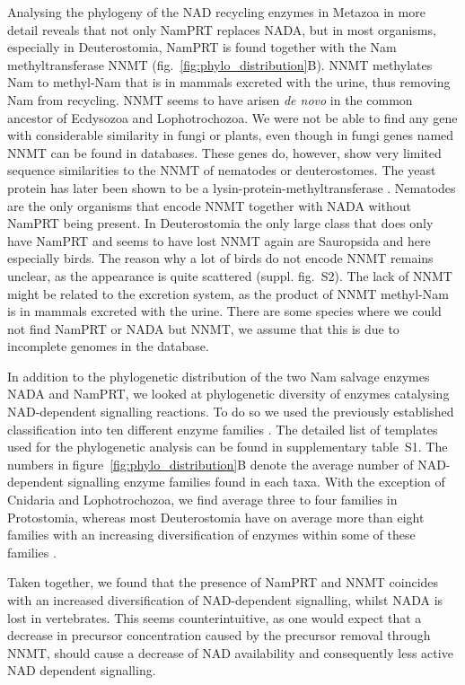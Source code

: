 Analysing the phylogeny of the NAD recycling enzymes in Metazoa in more detail reveals that not only NamPRT replaces NADA, but in most organisms, especially in Deuterostomia, NamPRT is found together with the Nam methyltransferase NNMT (fig.~\ref{fig:phylo_distribution}B). NNMT methylates Nam to methyl-Nam that is in mammals excreted with the urine, thus removing Nam from recycling. NNMT seems to have arisen \textit{de novo} in the common ancestor of Ecdysozoa and Lophotrochozoa. We were not be able to find any gene with considerable similarity in fungi or plants, even though in fungi genes named NNMT can be found in databases. These genes do, however, show very limited sequence similarities to the NNMT of nematodes or deuterostomes. The yeast protein has later been shown to be a lysin-protein-methyltransferase \cite{Wlodarski2011}. Nematodes are the only organisms that encode NNMT together with NADA without NamPRT being present. In Deuterostomia the only large class that does only have NamPRT and seems to have lost NNMT again are Sauropsida and here especially birds. The reason why a lot of birds do not encode NNMT remains unclear, as the appearance is quite scattered (suppl. fig.~S2). The lack of NNMT might be related to the excretion system, as the product of NNMT methyl-Nam is in mammals excreted with the urine. There are some species where we could not find NamPRT or NADA but NNMT, we assume that this is due to incomplete genomes in the database.

In addition to the phylogenetic distribution of the two Nam salvage enzymes NADA and NamPRT, we looked at phylogenetic diversity of enzymes catalysing NAD-dependent signalling reactions. To do so we used the previously established classification into ten different enzyme families \cite{Gossmann2012FEBS}. The detailed list of templates used for the phylogenetic analysis can be found in supplementary table~S1. The numbers in figure~\ref{fig:phylo_distribution}B denote the average number of NAD-dependent signalling enzyme families found in each taxa. With the exception of Cnidaria and Lophotrochozoa, we find average three to four families in Protostomia, whereas most Deuterostomia have on average more than eight families with an increasing diversification of enzymes within some of these families \cite{Gossmann2014DNAR}.

Taken together, we found that the presence of NamPRT and NNMT coincides with an increased diversification of NAD-dependent signalling, whilst NADA is lost in vertebrates. This seems counterintuitive, as one would expect that a decrease in precursor concentration caused by the precursor removal through NNMT, should cause a decrease of NAD availability and consequently less active NAD dependent signalling.


